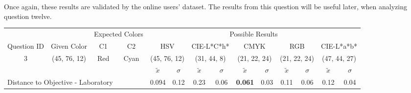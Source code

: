 %
Once again, these results are validated by the online users' dataset. The results from this question will be useful later, when analyzing question twelve.
%
\begin{table}[H]
  \resizebox{\textwidth}{!} {
  \begin{tabular}{lccccccccccccc}
    \hline
    \multicolumn{1}{c}{}                              &                                      & \multicolumn{2}{c}{Expected Colors}                   & \multicolumn{10}{c}{Possible Results}                                                                                                                                                                                                                                                                                        \\ \cline{3-14}
    \multicolumn{1}{c}{\multirow{-2}{*}{Question ID}} & \multirow{-2}{*}{Given Color}        & C1                       & C2                         & \multicolumn{2}{c}{HSV}                                        & \multicolumn{2}{c}{CIE-L*C*h*}                                 & \multicolumn{2}{c}{CMYK}                                       & \multicolumn{2}{c}{RGB}                                        & \multicolumn{2}{c}{CIE-L*a*b*}                                 \\ \hline
    \multicolumn{1}{c}{3}                             & \cellcolor[HTML]{80FF00}(45, 76, 12) & \multicolumn{1}{c|}{Red} & \multicolumn{1}{c|}{Cyan}  & \multicolumn{2}{c|}{\cellcolor[HTML]{80FF00}(45, 76, 12)}      & \multicolumn{2}{c|}{\cellcolor[HTML]{91C01D}(31, 44, 8)}       & \multicolumn{2}{c|}{\cellcolor[HTML]{808080}(21, 22, 24)}       & \multicolumn{2}{c|}{\cellcolor[HTML]{808080}(21, 22, 24)}       & \multicolumn{2}{c|}{\cellcolor[HTML]{DDA581}(47, 44, 27)}       \\ \hline
                                                      & \multicolumn{1}{l}{}                 & \multicolumn{1}{l}{}     & \multicolumn{1}{l}{}       & \multicolumn{1}{c}{$\tilde{x}$} & \multicolumn{1}{c}{$\sigma$} & \multicolumn{1}{c}{$\tilde{x}$} & \multicolumn{1}{c}{$\sigma$} & \multicolumn{1}{c}{$\tilde{x}$} & \multicolumn{1}{c}{$\sigma$} & \multicolumn{1}{c}{$\tilde{x}$} & \multicolumn{1}{c}{$\sigma$} & \multicolumn{1}{c}{$\tilde{x}$} & \multicolumn{1}{c}{$\sigma$} \\ \hline
    \multicolumn{4}{l}{Distance to Objective - Laboratory}                                                                                           & \multicolumn{1}{|c}{0.094}       & \multicolumn{1}{c|}{0.12}    & \multicolumn{1}{|c}{0.23}       & \multicolumn{1}{c|}{0.06}    & \multicolumn{1}{|c}{\textbf{0.061}}       & \multicolumn{1}{c|}{0.03}    & \multicolumn{1}{|c}{0.11}       & \multicolumn{1}{c|}{0.06}    & \multicolumn{1}{|c}{0.12}       & \multicolumn{1}{c|}{0.04}    \\

\end{tabular}}
\end{table}
